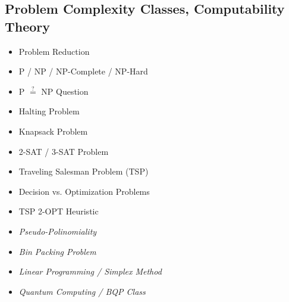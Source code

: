 \documentclass[10pt,a4paper]{article}
\begin{document}
\begin{landscape}
\begin{multicols*}{4}
\subsection*{Problem Complexity Classes, Computability Theory}
\begin{itemize}
    \item Problem Reduction
    \item P / NP / NP-Complete / NP-Hard
    \item P \(\stackrel{?}{=}\) NP Question
    \item Halting Problem
    \item Knapsack Problem
    \item 2-SAT / 3-SAT Problem
    \item Traveling Salesman Problem (TSP)
    \item Decision vs. Optimization Problems
    \item TSP 2-OPT Heuristic
    \item \textit{Pseudo-Polinomiality}
    \item \textit{Bin Packing Problem}
    \item \textit{Linear Programming / Simplex Method}
    \item \textit{Quantum Computing / BQP Class}
\end{itemize}

\end{multicols*}


\end{landscape}
\end{document}
